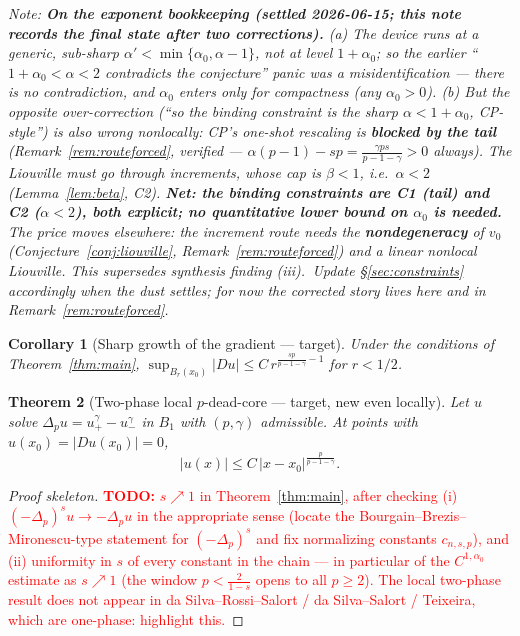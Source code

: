 \documentclass[11pt]{amsart}
\theoremstyle{plain}
\newtheorem{theorem}{Theorem}[section]
\newtheorem{corollary}[theorem]{Corollary}
\theoremstyle{definition}
\theoremstyle{remark}
\newcommand{\fpl}[1]{(-\Delta_p)^{s}#1}            %
\newcommand{\al}{\alpha}
\newcommand{\TODO}[1]{\textcolor{red}{\textbf{TODO:} #1}}
\newcommand{\NOTE}[1]{\textcolor{blue!70!black}{\textit{Note: #1}}}
\begin{document}
\NOTE{\textbf{On the exponent bookkeeping (settled 2026-06-15; this note
records the final state after two corrections).} (a) The device runs at a
\emph{generic, sub-sharp} $\al'<\min\{\al_0,\al-1\}$, \emph{not} at level
$1+\al_0$; so the earlier ``$1+\al_0<\al<2$ contradicts the conjecture''
panic was a misidentification --- there is no contradiction, and $\al_0$
enters only for compactness (any $\al_0>0$). (b) But the \emph{opposite}
over-correction (``so the binding constraint is the sharp $\al<1+\al_0$,
CP-style'') is \emph{also} wrong nonlocally: CP's one-shot rescaling is
\textbf{blocked by the tail} (Remark~\ref{rem:routeforced}, verified ---
$\al(p-1)-sp=\frac{\gamma ps}{p-1-\gamma}>0$ always). The Liouville must go
through \emph{increments}, whose cap is $\beta<1$, i.e.\ $\boxed{\al<2}$
(Lemma~\ref{lem:beta}, C2). \textbf{Net: the binding constraints are C1
(tail) and C2 ($\al<2$), both explicit; no quantitative lower bound on
$\al_0$ is needed.} The price moves elsewhere: the increment route needs
the \textbf{nondegeneracy} of $v_0$ (Conjecture~\ref{conj:liouville},
Remark~\ref{rem:routeforced}) and a linear nonlocal Liouville. \emph{This
supersedes synthesis finding (iii).} $\,$Update \S\ref{sec:constraints}
accordingly when the dust settles; for now the corrected story lives here
and in Remark~\ref{rem:routeforced}.}
\begin{corollary}[Sharp growth of the gradient --- target]
Under the conditions of Theorem~\ref{thm:main},
$\sup_{B_r(x_0)}|Du|\le C\,r^{\frac{sp}{p-1-\gamma}-1}$ for $r<1/2$.
\end{corollary}
\begin{theorem}[Two-phase local $p$-dead-core --- target, new even locally]\label{thm:local}
Let $u$ solve $\Delta_p u = u_+^{\gamma}-u_-^{\gamma}$ in $B_1$ with
$(p,\gamma)$ admissible. At points with $u(x_0)=|Du(x_0)|=0$,
\[
  |u(x)|\le C\,|x-x_0|^{\frac{p}{p-1-\gamma}} .
\]
\end{theorem}
\begin{proof}[Proof skeleton]
\TODO{$s\nearrow1$ in Theorem~\ref{thm:main}, after checking
(i) $\fpl{u}\to-\Delta_p u$ in the appropriate sense (locate the
Bourgain--Brezis--Mironescu-type statement for $\fpl{}$ and fix
normalizing constants $c_{n,s,p}$), and
(ii) uniformity in $s$ of every constant in the chain --- in particular
of the $C^{1,\al_0}$ estimate as $s\nearrow1$ (the window
$p<\frac{2}{1-s}$ opens to all $p\ge2$). The local two-phase result does
not appear in da Silva--Rossi--Salort / da Silva--Salort / Teixeira, which
are one-phase: highlight this.}
\end{proof}
\end{document}
